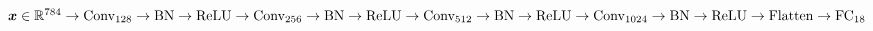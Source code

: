 $\vect{x} \in \real^{784} \newline
	\rightarrow \text{Conv}_{128} \rightarrow \text{BN} \rightarrow \text{ReLU}  \newline
	\rightarrow \text{Conv}_{256} \rightarrow \text{BN} \rightarrow \text{ReLU} \newline
	\rightarrow \text{Conv}_{512} \rightarrow \text{BN} \rightarrow \text{ReLU} \newline
	\rightarrow \text{Conv}_{1024} \rightarrow \text{BN} \rightarrow \text{ReLU} \newline
	\rightarrow \text{Flatten} \rightarrow \text{FC}_{18}$